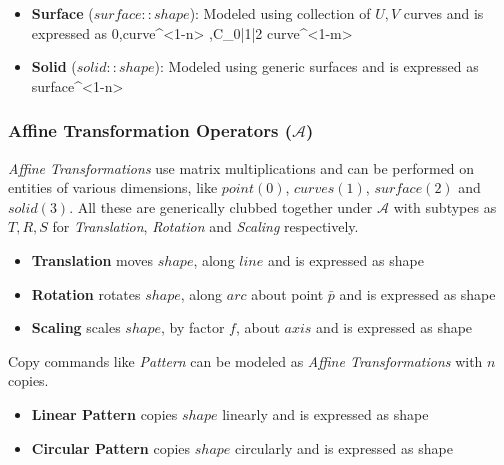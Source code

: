 \begin{itemize}[noitemsep,topsep=2pt,parsep=2pt,partopsep=2pt,label={},leftmargin=*]
\item {\bf Surface} ($surface::shape$): Modeled using collection of $U,V$ curves	and is expressed as  {0,curve{^{<1-n>} },C_{0|1|2}} {curve{^{<1-m>} }}   

\item {\bf Solid} ($solid::shape$): Modeled using generic surfaces and is expressed as  {surface{^{<1-n>} }}

\end{itemize}


\subsubsection{Affine Transformation Operators ($\mathcal{A}$)}

{\em Affine Transformations} use matrix multiplications and can be performed on entities of various dimensions, like $point (0)$, $curves(1)$, $surface(2)$ and $solid(3)$. All these are generically clubbed together under {\bf $\mathcal{A}$} with subtypes as $T,R,S$ for {\em Translation}, {\em Rotation} and {\em Scaling} respectively.


\begin{itemize}[noitemsep,topsep=2pt,parsep=2pt,partopsep=2pt,label={},leftmargin=*]
\item {\bf Translation} moves $shape$, along $line$ and is expressed as 	 {shape}
\item{\bf Rotation} rotates $shape$, along $arc$ about point $\bar{p}$ and is expressed as 	 {shape}	
\item {\bf Scaling} scales $shape$, by factor  $f$, about $axis$ and is expressed as 	 {shape}	
\end{itemize}

Copy commands like {\em Pattern} can be modeled as {\em Affine Transformations} with $n$ copies.

\begin{itemize}[noitemsep,topsep=2pt,parsep=2pt,partopsep=2pt,label={},leftmargin=*]
\item {\bf Linear Pattern} copies $shape$ linearly and is expressed as  {shape} 
\item {\bf Circular Pattern} copies $shape$ circularly and is expressed as  {shape} 
\end{itemize}


